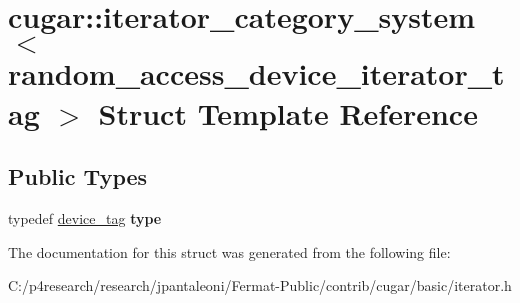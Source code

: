 \hypertarget{structcugar_1_1iterator__category__system_3_01random__access__device__iterator__tag_01_4}{}\section{cugar\+:\+:iterator\+\_\+category\+\_\+system$<$ random\+\_\+access\+\_\+device\+\_\+iterator\+\_\+tag $>$ Struct Template Reference}
\label{structcugar_1_1iterator__category__system_3_01random__access__device__iterator__tag_01_4}
\subsection*{Public Types}
\begin{DoxyCompactItemize}
\item 
\mbox{\label{structcugar_1_1iterator__category__system_3_01random__access__device__iterator__tag_01_4_aa0dee41ab21de30e05f25086e7a63d3d}} 
typedef \hyperlink{structcugar_1_1device__tag}{device\+\_\+tag} {\bfseries type}
\end{DoxyCompactItemize}


The documentation for this struct was generated from the following file\+:\begin{DoxyCompactItemize}
\item 
C\+:/p4research/research/jpantaleoni/\+Fermat-\/\+Public/contrib/cugar/basic/iterator.\+h\end{DoxyCompactItemize}
